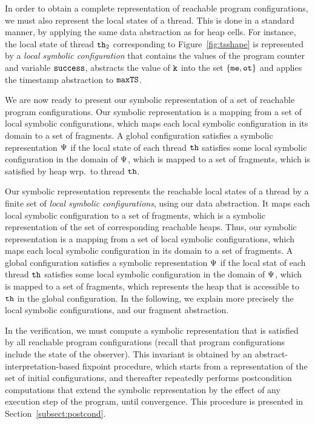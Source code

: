 In order to obtain a complete representation of reachable program configurations,
we must also represent the local states of a thread. This is done in a standard
manner, by applying the same data abstraction as for heap cells. For instance,
the local state of thread ${\tt th}_2$ corresponding to
Figure~\ref{fig:tsshape} is represented by a {\em local symbolic configuration}
that contains the values of the program counter and variable $\tt success$,
abstracts the value of ${\tt k}$ into the set $\left\{{\tt me},{\tt ot}\right\}$ and
applies the timestamp abstraction to ${\tt maxTS}$.

We are now ready to present our symbolic representation of a set of
reachable program configurations. 
Our symbolic representation is a mapping from a set of local symbolic
configurations, which maps each local symbolic configuration in its domain
to a set of fragments.
A global configuration satisfies a symbolic representation $\Psi$
if the local state of each thread ${\tt th}$ satisfies some local symbolic
configuration in the domain of $\Psi$, which is mapped to a set
of fragments, which is satisfied by heap wrp.\ to thread ${\tt th}$.


Our symbolic representation represents the reachable local states of a thread by
a finite set of {\em local symbolic configurations}, using our
data abstraction.
It maps each local symbolic configuration to a set of fragments, which
is a symbolic representation of the set of corresponding reachable heaps.
Thus, our symbolic representation is a mapping from a set of local symbolic
configurations, which maps each local symbolic configuration in its domain
to a set of fragments.
A global configuration satisfies a symbolic representation $\Psi$
if the local stat of each thread ${\tt th}$ satisfies some local symbolic
configuration in the domain of $\Psi$, which is mapped to a set
of fragments, which represents the heap that is accessible to ${\tt th}$ in
the global configuration. In the following, we explain more precisely the
local symbolic configurations, and our fragment abstraction.

In the  verification, we must compute a symbolic representation
that is satisfied by all reachable program configurations (recall that
program configurations include the state of the observer).
This invariant is obtained by an abstract-interpretation-based
fixpoint procedure, which starts
from a representation of the set of initial configurations, and
thereafter repeatedly performs
postcondition computations that extend the
symbolic representation by the effect of any execution step of the program,
until convergence.
This procedure is presented in Section~\ref{subsect:postcond}.





